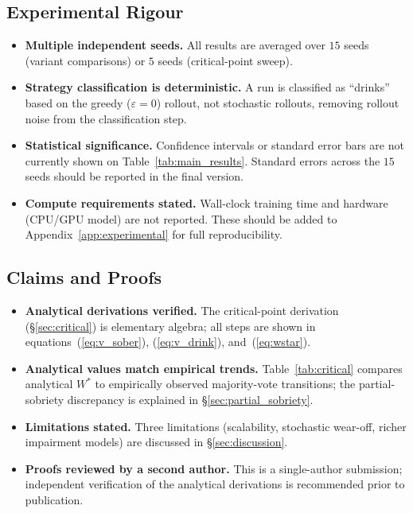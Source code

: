 \documentclass[manuscript, screen, review]{jair}
\begin{document}
\subsection*{Experimental Rigour}
\begin{itemize}[noitemsep]
  \item[\checkmark] \textbf{Multiple independent seeds.}
    All results are averaged over $15$ seeds (variant comparisons) or
    $5$ seeds (critical-point sweep).
  \item[\checkmark] \textbf{Strategy classification is deterministic.}
    A run is classified as ``drinks'' based on the greedy ($\varepsilon=0$)
    rollout, not stochastic rollouts, removing rollout noise from the
    classification step.
  \item[$\circ$] \textbf{Statistical significance.}
    Confidence intervals or standard error bars are not currently shown
    on Table~\ref{tab:main_results}. Standard errors across the $15$
    seeds should be reported in the final version.
  \item[$\circ$] \textbf{Compute requirements stated.}
    Wall-clock training time and hardware (CPU/GPU model) are not reported.
    These should be added to Appendix~\ref{app:experimental} for full
    reproducibility.
\end{itemize}

\subsection*{Claims and Proofs}
\begin{itemize}[noitemsep]
  \item[\checkmark] \textbf{Analytical derivations verified.}
    The critical-point derivation (\S\ref{sec:critical}) is elementary
    algebra; all steps are shown in equations~(\ref{eq:v_sober}),
    (\ref{eq:v_drink}), and~(\ref{eq:wstar}).
  \item[\checkmark] \textbf{Analytical values match empirical trends.}
    Table~\ref{tab:critical} compares analytical $W^*$ to empirically
    observed majority-vote transitions; the partial-sobriety discrepancy
    is explained in \S\ref{sec:partial_sobriety}.
  \item[\checkmark] \textbf{Limitations stated.}
    Three limitations (scalability, stochastic wear-off, richer impairment
    models) are discussed in \S\ref{sec:discussion}.
  \item[$\circ$] \textbf{Proofs reviewed by a second author.}
    This is a single-author submission; independent verification of the
    analytical derivations is recommended prior to publication.
\end{itemize}
\end{document}
